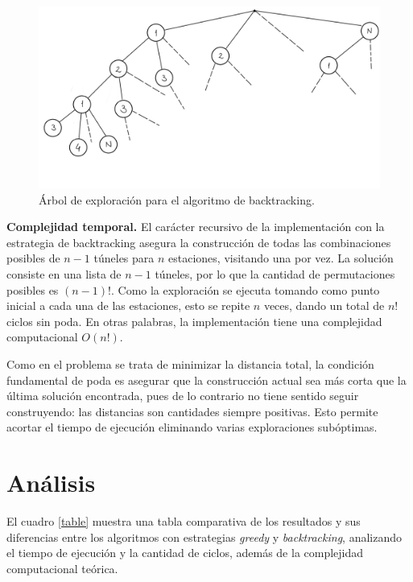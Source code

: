\documentclass[10 pt, A4paper]{article}
\begin{document}
	\begin{figure}[h]
		\centering
		\includegraphics[scale = 0.18]{Árbol de exploración.png}
		\caption{Árbol de exploración para el algoritmo de backtracking.}
		\label{tree}
	\end{figure}
	
	\textbf{Complejidad temporal.} El carácter recursivo de la implementación con la estrategia de backtracking asegura la construcción de todas las combinaciones posibles de $n-1$ túneles para $n$ estaciones, visitando una por vez. La solución consiste en una lista de $n-1$ túneles, por lo que la cantidad de permutaciones posibles es $(n-1)!$. Como la exploración se ejecuta tomando como punto inicial a cada una de las estaciones, esto se repite $n$ veces, dando un total de $n!$ ciclos sin poda. En otras palabras, la implementación tiene una complejidad computacional $O(n!)$.
	
	Como en el problema se trata de minimizar la distancia total, la condición fundamental de poda es asegurar que la construcción actual sea más corta que la última solución encontrada, pues de lo contrario no tiene sentido seguir construyendo: las distancias son cantidades siempre positivas. Esto permite acortar el tiempo de ejecución eliminando varias exploraciones subóptimas.
	
	\section*{Análisis}
	El cuadro \ref{table} muestra una tabla comparativa de los resultados y sus diferencias entre los algoritmos con estrategias \textit{greedy} y \textit{backtracking}, analizando el tiempo de ejecución y la cantidad de ciclos, además de la complejidad computacional teórica.
	
\end{document}
